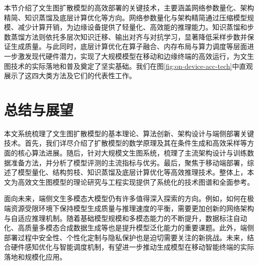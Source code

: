 \documentclass[11pt,a4paper,UTF8]{ctexart}
\begin{document}
本节介绍了文生图扩散模型的高效部署的关键技术，主要涵盖网络参数量化、架构精简、知识蒸馏及底层计算优化等方向。网络参数量化与架构精简通过压缩模型规模、减少计算开销，为边缘设备提供了轻量化、高效能的推理能力。知识蒸馏和步数蒸馏方法则依托多层次知识迁移、输出对齐与对抗学习，显著降低采样步数并保证生成质量。与此同时，底层计算优化在算子融合、内存布局与算力调度等层面进一步激发现代硬件潜力，实现了大规模模型在移动和边缘终端的高效运行，为文生图技术的实际落地和普及奠定了坚实基础。我们在图\ref{fig:on-device-acc-tech}中直观展示了这四大类方法及它们的代表性工作。


\newpage

\section{总结与展望}

本文系统梳理了文生图扩散模型的基本理论、算法创新、架构设计与端侧部署关键技术。首先，我们详尽介绍了扩散模型的数学原理及其在条件生成和高效采样等方面的核心算法进展。随后，针对大规模文生图系统，梳理了主流架构设计与训练数据准备方法，并分析了模型评测的主流指标与优劣。最后，聚焦于移动端部署，综述了模型量化、结构剪枝、知识蒸馏及底层计算优化等高效推理技术。整体上，本文为高效文生图模型的理论研究与工程实现提供了系统化的技术图谱和全面参考。

面向未来，端侧文生多模态大模型仍有许多值得深入探索的方向。例如，如何在极端资源受限环境下保持模型生成质量与推理速度的平衡，需要更加创新的网络架构与自适应推理机制。随着基础模型规模和多模态能力的不断提升，数据标注自动化、高质量多模态合成数据生成等也是提升模型泛化能力的重要课题。此外，端侧部署过程中安全性、个性化定制与隐私保护也是迫切需要关注的新挑战。未来，结合硬件感知优化与智能调度机制，有望进一步推动生成模型在移动智能终端的实际落地和规模化应用。

\end{document}
